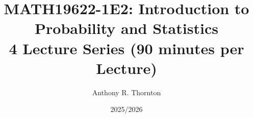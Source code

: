 \newcommand{\insertcode}[2]{%
  \only<presentation>{%
    \setbeamercolor{block title}{bg=SolarizedAccent, fg=black}
    \setbeamercolor{block body}{bg=SolarizedYellow, fg=black}%
    \begin{block}{#1}
      
    \end{block}%
  }%
  \only<article>{%
    \vspace{0.2cm}
    
    \vspace{0.2cm}
  }%
}



\title[MATh19622-1E2]{\textbf{MATH19622-1E2: Introduction to Probability and Statistics}\\
\large 4 Lecture Series (90 minutes per Lecture)}
\author{Anthony R. Thornton}
\date{2025/2026}
